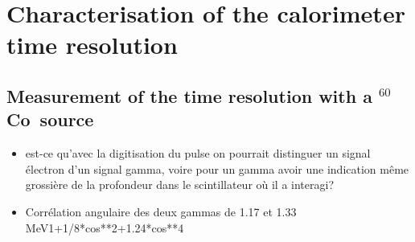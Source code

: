 \documentclass[a4paper,12pt, twoside]{memoir}   	%
\newcommand{\Co}{$^{60}$Co}
\begin{document}
               \chapter{Characterisation of the calorimeter time resolution}
               \section{Measurement of the time resolution with a \Co\ source}
               \begin{itemize}
               \item est-ce qu'avec la digitisation du pulse on pourrait distinguer un signal électron d'un signal gamma, voire pour un gamma avoir une indication même grossière de la profondeur dans le scintillateur où il a interagi?
               \item Corrélation angulaire des deux gammas de 1.17 et 1.33 MeV1+1/8*cos**2+1.24*cos**4
               \end{itemize}
\end{document}
